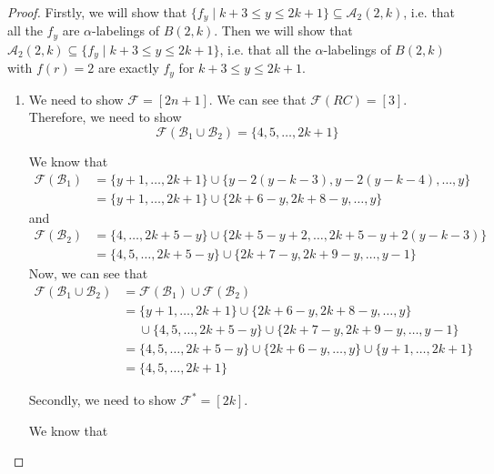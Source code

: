 \documentclass[10pt]{article}
\theoremstyle{definition}
\begin{document}
\begin{proof}
  Firstly, we will show that $\{f_y \mid k + 3 \le y \le 2k + 1\} \subseteq \mathcal{A}_2(2, k)$, i.e. that all the $f_y$ are $\alpha$-labelings of $B(2, k)$. Then we will show that $\mathcal{A}_2(2, k) \subseteq \{f_y \mid k + 3 \le y \le 2k + 1\}$, i.e. that all the $\alpha$-labelings of $B(2,k)$ with $f(r) = 2$ are exactly $f_y$ for $k + 3 \le y \le 2k + 1$.

  \begin{enumerate}
    \item We need to show $\mathcal{F} = [2n + 1]$. We can see that $\mathcal{F}(RC) = [3]$. Therefore, we need to show
      $$
      \mathcal{F}\left(\mathcal{B}_1 \cup \mathcal{B}_2\right) = \{4,5,\dots,2k+1\}
      $$

      We know that
      \begin{align*}
        \mathcal{F}(\mathcal{B}_1) &= \{y + 1, \dots, 2k + 1\} \cup \{y - 2(y - k - 3), y - 2(y - k - 4), \dots, y\}\\
        &= \{y + 1, \dots, 2k + 1\} \cup \{2k + 6 - y, 2k + 8 - y, \dots, y\}
      \end{align*}
      and
      \begin{align*}
        \mathcal{F}(\mathcal{B}_2) &= \{4, \dots, 2k + 5 - y\} \cup \{2k + 5 - y + 2, \dots, 2k + 5 - y + 2(y - k - 3)\}\\
        &= \{4, 5, \dots, 2k + 5 - y\} \cup \{2k + 7 - y, 2k + 9 - y, \dots, y - 1\}
      \end{align*}
      Now, we can see that
      \begin{align*}
        \mathcal{F}\left(\mathcal{B}_1 \cup \mathcal{B}_2\right) &= \mathcal{F}(\mathcal{B}_1) \cup \mathcal{F}(\mathcal{B}_2)\\
        &= \{y + 1, \dots, 2k + 1\} \cup \{2k + 6 - y, 2k + 8 - y, \dots, y\} \\ &\quad\;\cup \{4, 5, \dots, 2k + 5 - y\} \cup \{2k + 7 - y, 2k + 9 - y, \dots, y - 1\}\\
        &= \{4, 5, \dots, 2k + 5 - y\} \cup \{2k + 6 - y, \dots, y\} \cup \{y + 1, \dots, 2k + 1\}\\
        &= \{4, 5, \dots, 2k + 1\}
      \end{align*}

      Secondly, we need to show $\mathcal{F}^* = [2k]$.

      We know that


\end{enumerate}
\end{proof}
\end{document}

